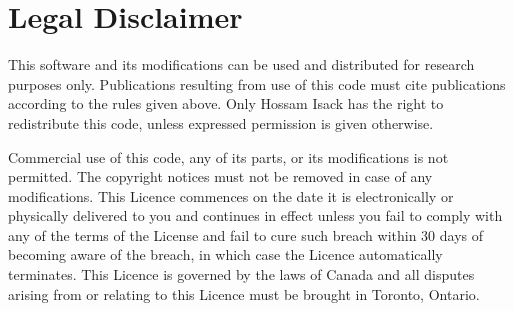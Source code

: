 \documentclass[12pt,letterpaper]{article}
\begin{document}
\restoregeometry %
\nopagecolor%



\pagestyle{empty}
\tableofcontents
\newpage
\section{Legal Disclaimer}


This software and its modifications can be used and distributed for
   research purposes only. Publications resulting from use of this code
    must cite publications according to the rules given above. Only
    Hossam Isack has the right to redistribute this code, unless expressed
    permission is given otherwise.

Commercial use of this code, any of
    its parts, or its modifications is not permitted. The copyright notices
    must not be removed in case of any modifications. This Licence
    commences on the date it is electronically or physically delivered
    to you and continues in effect unless you fail to comply with any of
    the terms of the License and fail to cure such breach within 30 days
    of becoming aware of the breach, in which case the Licence automatically
    terminates. This Licence is governed by the laws of Canada and all
    disputes arising from or relating to this Licence must be brought
    in Toronto, Ontario.
\end{document}
